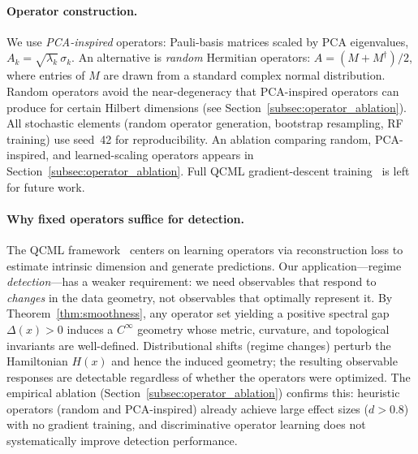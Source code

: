 \documentclass[3p]{elsarticle}
\begin{document}
\paragraph{Operator construction.}
We use \emph{PCA-inspired} operators: Pauli-basis matrices scaled by
PCA eigenvalues, $A_k = \sqrt{\lambda_k}\,\sigma_k$.  An alternative
is \emph{random} Hermitian operators: $A = (M + M^\dagger)/2$, where
entries of $M$ are drawn from a standard complex normal distribution.
Random operators avoid the near-degeneracy that PCA-inspired operators
can produce for certain Hilbert dimensions (see
Section~\ref{subsec:operator_ablation}).  All stochastic elements
(random operator generation, bootstrap resampling, RF training) use
seed~42 for reproducibility.  An ablation comparing random,
PCA-inspired, and learned-scaling operators appears in
Section~\ref{subsec:operator_ablation}.  Full QCML gradient-descent
training~\cite{musaelian2024,samson2024} is left for future work.

\paragraph{Why fixed operators suffice for detection.}
The QCML framework~\cite{candelori2025} centers on learning operators
via reconstruction loss to estimate intrinsic dimension and generate
predictions.  Our application---regime \emph{detection}---has a weaker
requirement: we need observables that respond to \emph{changes} in the
data geometry, not observables that optimally represent it.
By Theorem~\ref{thm:smoothness}, any operator set yielding a positive
spectral gap $\Delta(x) > 0$ induces a $C^\infty$ geometry whose
metric, curvature, and topological invariants are well-defined.
Distributional shifts (regime changes) perturb the Hamiltonian
$H(x)$ and hence the induced geometry; the resulting observable
responses are detectable regardless of whether the operators were
optimized.  The empirical ablation
(Section~\ref{subsec:operator_ablation}) confirms this: heuristic
operators (random and PCA-inspired) already achieve large effect sizes
($d > 0.8$) with no gradient training, and discriminative operator
learning does not systematically improve detection performance.
\end{document}

